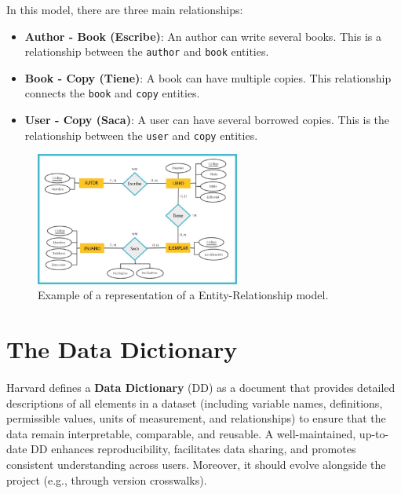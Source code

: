 \documentclass{article}
\begin{document}
In this model, there are three main relationships:

\begin{itemize}
    \item \textbf{Author - Book (Escribe)}: An author can write several books. This is a relationship between the \texttt{author} and \texttt{book} entities.

    \item \textbf{Book - Copy (Tiene)}: A book can have multiple copies. This relationship connects the \texttt{book} and \texttt{copy} entities.

    \item \textbf{User - Copy (Saca)}: A user can have several borrowed copies. This is the relationship between the \texttt{user} and \texttt{copy} entities.
\end{itemize}

\begin{figure}
	\centering
	\includegraphics[width=0.6\textwidth]{figures/entidad-relacion-ejemplo2.jpg}
	\caption{Example of a representation of a Entity-Relationship model.}
	\label{fig:erexample2}
\end{figure}

\section{The Data Dictionary} \label{sec:dd}
\paragraph{}
Harvard defines a \textbf{Data Dictionary} (DD) as a document that provides detailed descriptions of all elements in a dataset (including variable names, definitions, permissible values, units of measurement, and relationships) to ensure that the data remain interpretable, comparable, and reusable. A well-maintained, up-to-date DD enhances reproducibility, facilitates data sharing, and promotes consistent understanding across users. Moreover, it should evolve alongside the project (e.g., through version crosswalks).
\end{document}
